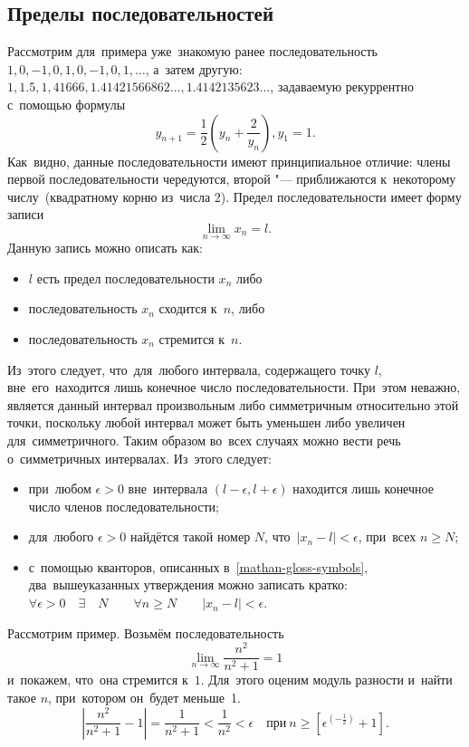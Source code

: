 \documentclass[]{scrartcl}
\begin{document}
\subsection{Пределы последовательностей}
Рассмотрим для~примера уже~знакомую ранее последовательность $1, 0, -1, 0, 1, 0, -1, 0, 1,\ldots$, а~затем другую: $1, 1.5, 1,41666, 1.41421566862\ldots, 1.4142135623\ldots$, задаваемую рекуррентно с~помощью формулы
\begin{equation}\label{eq:recurr}
y_{n+1}=\frac{1}{2}(y_n+\frac{2}{y_n}), y_1=1.
\end{equation}
Как~видно, данные последовательности имеют принципиальное отличие: члены первой последовательности чередуются, второй "--- приближаются к~некоторому числу~(квадратному корню из~числа 2).
Предел последовательности имеет форму записи
\begin{equation}\label{eq:limit1}
\lim_{n\to\infty}x_n=l.
\end{equation}
Данную запись можно описать как:
\begin{itemize}
	\item $l$ есть предел последовательности $x_n$ либо
	\item последовательность $x_n$ сходится к~$n$, либо
	\item последовательность $x_n$ стремится к~$n$.
\end{itemize}
Из~этого следует, что~для~любого интервала, содержащего точку $l$, вне~его~находится лишь конечное число последовательности. При~этом неважно, является данный интервал произвольным либо симметричным относительно этой точки, поскольку любой интервал может быть уменьшен либо увеличен для~симметричного. Таким образом во~всех случаях можно вести речь о~симметричных интервалах. Из~этого следует:
\begin{itemize}
	\item при~любом $\epsilon > 0$ вне~интервала $(l-\epsilon, l+\epsilon)$ находится лишь конечное число членов последовательности;
	\item для~любого $\epsilon > 0$ найдётся такой номер $N$, что~$|x_n-l| < \epsilon$, при~всех $n \geq N$;
	\item с~помощью кванторов, описанных в~\ref{mathan-gloss-symbols}, два~вышеуказанных утверждения можно записать кратко: $\forall \epsilon > 0 \quad \exists \quad N \qquad \forall n \geq N \qquad |x_n-l|<\epsilon$.
\end{itemize}
Рассмотрим пример. Возьмём последовательность
\begin{equation}\label{eq:limits2}
\lim_{n\to\infty}\frac{n^2}{n^2+1}=1
\end{equation}
и~покажем, что~она стремится к~$1$. Для~этого оценим модуль разности и~найти такое $n$, при~котором он~будет меньше~1.
\begin{equation}\label{eq:limits3}
|\frac{n^2}{n^2+1}-1|=\frac{1}{n^2+1}<\frac{1}{n^2}<\epsilon \quad \text{при}~n \geq [\epsilon^{(-\frac{1}{2})}+1].
\end{equation}
\end{document}
